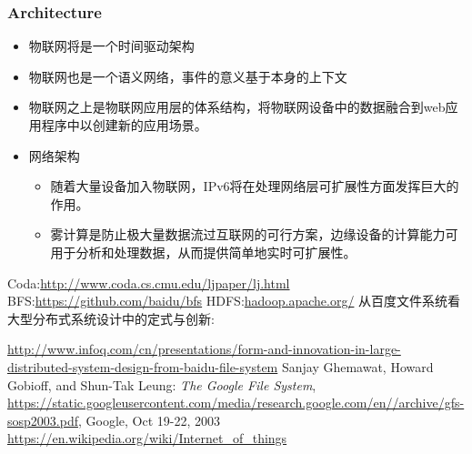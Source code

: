 \documentclass{ctexart}
\begin{document}
\subsubsection{Architecture}
\begin{itemize}
	\item 物联网将是一个时间驱动架构
	\item 物联网也是一个语义网络，事件的意义基于本身的上下文
	\item 物联网之上是物联网应用层的体系结构，将物联网设备中的数据融合到web应用程序中以创建新的应用场景。
	\item 网络架构
	\begin{itemize}
		\item 随着大量设备加入物联网，IPv6将在处理网络层可扩展性方面发挥巨大的作用。
		\item 雾计算是防止极大量数据流过互联网的可行方案，边缘设备的计算能力可用于分析和处理数据，从而提供简单地实时可扩展性。
	\end{itemize}
\end{itemize}
\begin{thebibliography}{6}
	Coda:\url{http://www.coda.cs.cmu.edu/ljpaper/lj.html}
	BFS:\url{https://github.com/baidu/bfs}
	HDFS:\url{hadoop.apache.org/}
	从百度文件系统看大型分布式系统设计中的定式与创新:

	\url{http://www.infoq.com/cn/presentations/form-and-innovation-in-large-distributed-system-design-from-baidu-file-system}
	Sanjay Ghemawat, Howard Gobioff, and Shun-Tak Leung: \textit{The Google File System}, \url{https://static.googleusercontent.com/media/research.google.com/en//archive/gfs-sosp2003.pdf}, Google, Oct 19-22, 2003
	\url{https://en.wikipedia.org/wiki/Internet_of_things}
\end{thebibliography}
\end{document}
